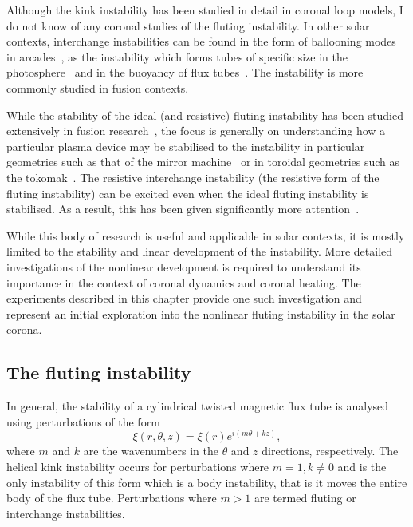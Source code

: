 Although the kink instability has been studied in detail in coronal loop models, I do not know of any coronal studies of the fluting instability. In other solar contexts, interchange instabilities can be found in the form of ballooning modes in arcades~\cite{hoodBallooningInstabilitiesSolar1986}, as the instability which forms tubes of specific size in the photosphere~\cite{bunteInterchangeInstabilitySolar1993} and in the buoyancy of flux tubes~\cite{schuesslerInterchangeInstabilitySmall1984}. The instability is more commonly studied in fusion contexts.

While the stability of the ideal (and resistive) fluting instability has been studied extensively in fusion research~\cite{mikhailovskiiInstabilitiesConfinedPlasma1998,zhengAdvancedTokamakStability2015,wessonHydromagneticStabilityTokamaks1978}, the focus is generally on understanding how a particular plasma device may be stabilised to the instability in particular geometries such as that of the mirror machine~\cite{jungwirthTheoryFluteInstability1965} or in toroidal geometries such as the tokomak~\cite{shafranovFluteInstabilityCurrentcarrying1968}. The resistive interchange instability (the resistive form of the fluting instability) can be excited even when the ideal fluting instability is stabilised. As a result, this has been given significantly more attention~\cite{johnsonResistiveInterchangesNegativeV1967,correa-restrepoResistiveBallooningModes1983}.

While this body of research is useful and applicable in solar contexts, it is mostly limited to the stability and linear development of the instability. More detailed investigations of the nonlinear development is required to understand its importance in the context of coronal dynamics and coronal heating. The experiments described in this chapter provide one such investigation and represent an initial exploration into the nonlinear fluting instability in the solar corona.

\subsection{The fluting instability}

In general, the stability of a cylindrical twisted magnetic flux tube is analysed using perturbations of the form
\begin{equation}
  \label{eq:kink_perturbation}
\xi(r, \theta, z) = \xi(r) e^{i(m\theta + kz)},
\end{equation}
where $m$ and $k$ are the wavenumbers in the $\theta$ and $z$ directions, respectively. The helical kink instability occurs for perturbations where $m=1, k\ne0$ and is the only instability of this form which is a body instability, that is it moves the entire body of the flux tube. Perturbations where $m>1$ are termed fluting or interchange instabilities.

